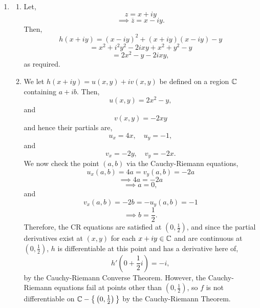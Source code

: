 \begin{enumerate}[label=(\alph*)]
\begin{enumerate}[label=(\roman*)]
    \end{enumerate}
    \leavevmode \vvs \\
    \newpage
    \item 
    \begin{enumerate}[label=(\roman*)]
        \item 
        Let,
        \[
        z = x + iy
        \]
        \[
        \implies \overline{z} = x - iy.
        \]
        Then,
        \[
        h(x+iy) = (x-iy)^2 + (x+iy)(x-iy) - y
        \]
        \[
        = x^2 + i^2y^2 - 2ixy +x^2 +y^2 - y
        \]
        \[
        = 2x^2 - y - 2ixy,
        \]
        as required.
        \item 
        We let $h(x+iy)=u(x,y)+iv(x,y)$ be defined on a region $\mathbb{C}$ containing $a+ib$. Then,
        \[
        u(x,y)=2x^2 - y,
        \]
        and
        \[
        v(x,y)=-2xy
        \]
        and hence their partials are,
        \[
        u_x = 4x,\quad u_y = -1,
        \]
        and
        \[
        v_x = -2y,\quad v_y = -2x.
        \]
        We now check the point $(a,b)$ via the Cauchy-Riemann equations,
        \[
        u_x(a,b) = 4a = v_y(a,b) = -2a
        \]
        \[
        \implies 4a = -2a
        \]
        \[
        \implies a = 0,
        \]
        and
        \[
        v_x(a,b)=-2b = -u_y(a,b) = -1
        \]
        \[
        \implies b = \frac{1}{2}.
        \]
        Therefore, the CR equations are satisfied at $(0, \frac{1}{2})$, and since the partial derivatives exist at $(x,y)$ for each $x+iy \in \mathbb{C}$ and are continuous at $(0, \frac{1}{2})$, $h$ is differentiable at this point and has a derivative here of,
        \[
        h'\left(0+\frac{1}{2}i\right) = - i,
        \]
        by the Cauchy-Riemann Converse Theorem. However, the Cauchy-Riemann equations fail at points other than $\left(0, \frac{1}{2}\right)$, so $f$ is not differentiable on $ \mathbb{C} - \big\{\left(0, \frac{1}{2}\right)\big\}$ by the Cauchy-Riemann Theorem.
        \end{enumerate}
\end{enumerate}


